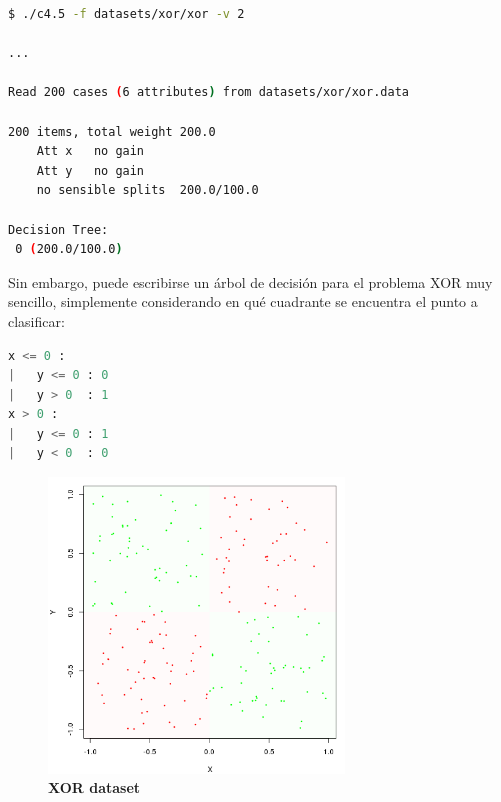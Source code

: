 \documentclass[a4paper, 11pt]{article} %
\begin{document}
\pagebreak

\begin{lstlisting}[language=Bash, xleftmargin = 2cm]
$ ./c4.5 -f datasets/xor/xor -v 2

...

Read 200 cases (6 attributes) from datasets/xor/xor.data

200 items, total weight 200.0
	Att x	no gain
	Att y	no gain
	no sensible splits  200.0/100.0

Decision Tree:
 0 (200.0/100.0)
\end{lstlisting}


Sin embargo, puede escribirse un árbol de decisión para el problema XOR muy
sencillo, simplemente considerando en qué cuadrante se encuentra el punto a
clasificar:\\

\begin{lstlisting}[language=Python, xleftmargin = 2cm]
x <= 0 :
|   y <= 0 : 0
|   y > 0  : 1
x > 0 :
|   y <= 0 : 1
|   y < 0  : 0
\end{lstlisting}

\begin{figure}[H]
\captionsetup[subfigure]{labelformat=empty}
  \centering
  \caption*{\textbf{XOR dataset}}
  \includegraphics[width=0.7\textwidth]{xor_classes.png}
\end{figure}
\end{document}
